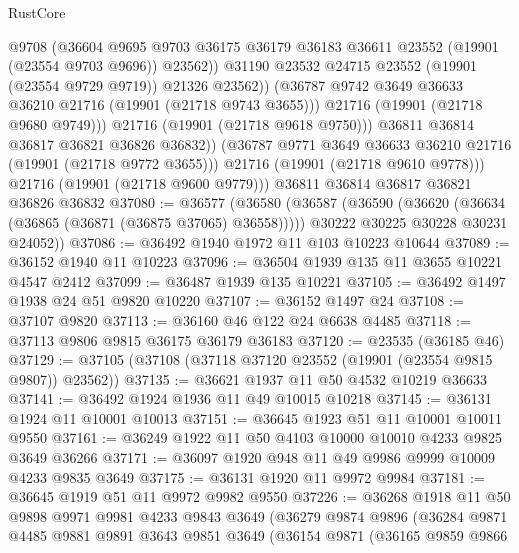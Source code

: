 \begin{lexlean}{RustCore}
\begin{coremodule}
                      @9708
                      (@36604
                        @9695
                        @9703
                        @36175
                        @36179
                        @36183
                        @36611
                        @23552
                        (@19901 (@23554 @9703 @9696))
                        @23562))
                    @31190
                    @23532
                    @24715
                    @23552
                    (@19901 (@23554 @9729 @9719))
                    @21326
                    @23562))
                (@36787 @9742 @3649 @36633 @36210 @21716 (@19901 (@21718 @9743 @3655)))
                @21716
                (@19901 (@21718 @9680 @9749)))
              @21716
              (@19901 (@21718 @9618 @9750)))
            @36811
            @36814
            @36817
            @36821
            @36826
            @36832))
        (@36787 @9771 @3649 @36633 @36210 @21716 (@19901 (@21718 @9772 @3655)))
        @21716
        (@19901 (@21718 @9610 @9778)))
      @21716
      (@19901 (@21718 @9600 @9779)))
    @36811
    @36814
    @36817
    @36821
    @36826
    @36832
@37080 := @36577
    (@36580
      (@36587
        (@36590 (@36620 (@36634 (@36865 (@36871 (@36875 @37065) @36558)))))
        @30222
        @30225
        @30228
        @30231
        @24052))
@37086 := @36492 @1940 @1972 @11 @103 @10223 @10644
@37089 := @36152 @1940 @11 @10223
@37096 := @36504 @1939 @135 @11 @3655 @10221 @4547 @2412
@37099 := @36487 @1939 @135 @10221
@37105 := @36492 @1497 @1938 @24 @51 @9820 @10220
@37107 := @36152 @1497 @24
@37108 := @37107 @9820
@37113 := @36160 @46 @122 @24 @6638 @4485
@37118 := @37113 @9806 @9815 @36175 @36179 @36183
@37120 := @23535 (@36185 @46)
@37129 := @37105 (@37108 (@37118 @37120 @23552 (@19901 (@23554 @9815 @9807)) @23562))
@37135 := @36621 @1937 @11 @50 @4532 @10219 @36633
@37141 := @36492 @1924 @1936 @11 @49 @10015 @10218
@37145 := @36131 @1924 @11 @10001 @10013
@37151 := @36645 @1923 @51 @11 @10001 @10011 @9550
@37161 := @36249 @1922 @11 @50 @4103 @10000 @10010 @4233 @9825 @3649 @36266
@37171 := @36097 @1920 @948 @11 @49 @9986 @9999 @10009 @4233 @9835 @3649
@37175 := @36131 @1920 @11 @9972 @9984
@37181 := @36645 @1919 @51 @11 @9972 @9982 @9550
@37226 := @36268
    @1918
    @11
    @50
    @9898
    @9971
    @9981
    @4233
    @9843
    @3649
    (@36279
      @9874
      @9896
      (@36284
        @9871
        @4485
        @9881
        @9891
        @3643
        @9851
        @3649
        (@36154
          @9871
          (@36165
            @9859
            @9866

\end{coremodule}
\end{lexlean}
